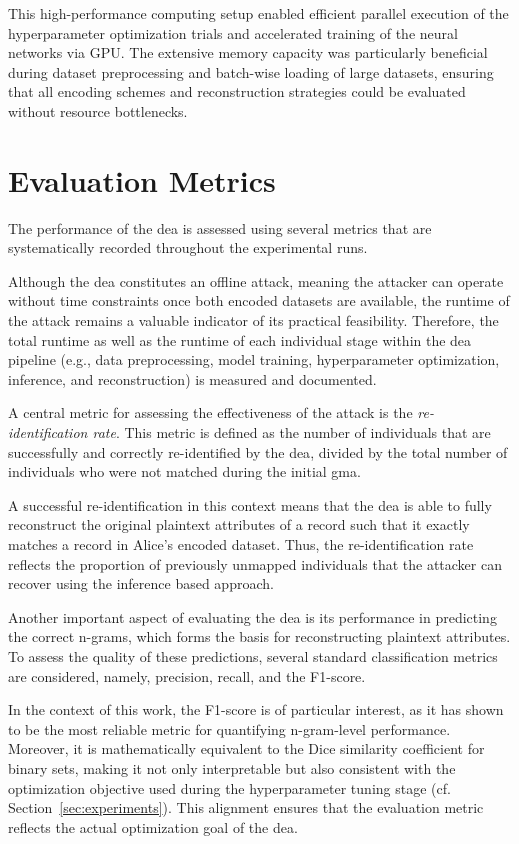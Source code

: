 This high-performance computing setup enabled efficient parallel execution of the hyperparameter optimization trials and accelerated training of the neural networks via GPU.
The extensive memory capacity was particularly beneficial during dataset preprocessing and batch-wise loading of large datasets, ensuring that all encoding schemes and reconstruction strategies could be evaluated without resource bottlenecks.

\section{Evaluation Metrics}  \label{sec:metrics}

The performance of the \ac{dea} is assessed using several metrics that are systematically recorded throughout the experimental runs.

Although the \ac{dea} constitutes an offline attack, meaning the attacker can operate without time constraints once both encoded datasets are available, the runtime of the attack remains a valuable indicator of its practical feasibility.
Therefore, the total runtime as well as the runtime of each individual stage within the \ac{dea} pipeline (e.g., data preprocessing, model training, hyperparameter optimization, inference, and reconstruction) is measured and documented.

A central metric for assessing the effectiveness of the attack is the \emph{re-identification rate}.
This metric is defined as the number of individuals that are successfully and correctly re-identified by the \ac{dea}, divided by the total number of individuals who were not matched during the initial \ac{gma}.

A successful re-identification in this context means that the \ac{dea} is able to fully reconstruct the original plaintext attributes of a record such that it exactly matches a record in Alice's encoded dataset.
Thus, the re-identification rate reflects the proportion of previously unmapped individuals that the attacker can recover using the inference based approach.

Another important aspect of evaluating the \ac{dea} is its performance in predicting the correct n-grams, which forms the basis for reconstructing plaintext attributes.
To assess the quality of these predictions, several standard classification metrics are considered, namely, precision, recall, and the F1-score.

In the context of this work, the F1-score is of particular interest, as it has shown to be the most reliable metric for quantifying n-gram-level performance.
Moreover, it is mathematically equivalent to the Dice similarity coefficient for binary sets, making it not only interpretable but also consistent with the optimization objective used during the hyperparameter tuning stage (cf. Section~\ref{sec:experiments}).
This alignment ensures that the evaluation metric reflects the actual optimization goal of the \ac{dea}.

